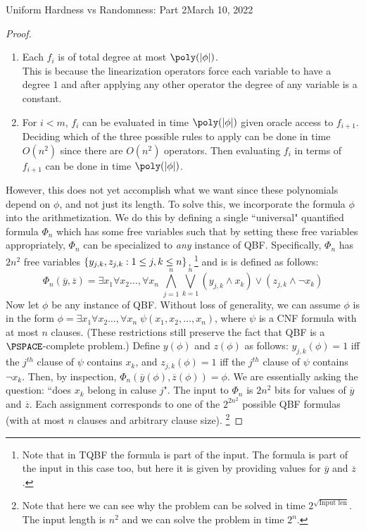 \begin{lecture}{8}{Uniform Hardness vs Randomness: Part 2}{March 10, 2022}
\begin{proof}
\begin{enumerate}
	\item Each $f_i$ is of total degree at most $\poly(\card{\phi})$. \\
	This is because the linearization operators force each variable to have a degree $1$ and after applying any other operator the degree of any variable is a constant.
	
	\item For $i < m$, $f_i$ can be evaluated in time $\poly(\card{\phi})$ given oracle access to $f_{i+1}$. \\
	Deciding which of the three possible rules to apply can be done in time $O(n^2)$ since there are $O(n^2)$ operators. Then evaluating $f_i$ in terms of $f_{i+1}$ can be done in time $\poly(\card{\phi})$.
\end{enumerate}

However, this does not yet accomplish what we want since these polynomials depend on $\phi$, and not just its length. To solve this, we incorporate the formula $\phi$ into the arithmetization. We do this by defining a single ``universal" quantified formula $\Phi_n$ which has some free variables such that by setting these free variables appropriately, $\Phi_n$ can be specialized to \emph{any} instance of QBF. Specifically, $\Phi_n$ has $2n^2$ free variables $\{y_{j,k}, z_{j,k} : 1 \leq j, k \leq n\}$, \footnote{Note that in TQBF the formula is part of the input. The formula is part of the input in this case too, but here it is given by providing values for $\overline{y}$ and $\overline{z}$. }
and is is defined as follows:
\[
	\Phi_n(\overline{y}, \overline{z}) = \exists x_1 \forall x_2 \ldots , \forall x_n \; \bigwedge_{j=1}^n \bigvee_{k=1}^n (y_{j,k} \wedge x_k) \vee (z_{j,k} \wedge \neg x_k)
\]
Now let $\phi$ be any instance of QBF. Without loss of generality, we can assume $\phi$ is in the form $\phi = \exists x_1 \forall x_2 \ldots , \forall x_n \; \psi(x_1,x_2, \ldots, x_n)$, where $\psi$ is a CNF formula with at most $n$ clauses. (These restrictions still preserve the fact that QBF is a $\PSPACE$-complete problem.)
Define $y(\phi)$ and $z(\phi)$ as follows: $y_{j,k}(\phi) = 1$ iff the $j^{th}$ clause of $\psi$ contains $x_k$, and $z_{j,k}(\phi) = 1$ iff the $j^{th}$ clause of $\psi$ contains $\neg x_k$. Then, by inspection, $\Phi_n(\overline{y}(\phi), \overline{z}(\phi)) = \phi$.
We are essentially asking the question: ``does $x_k$ belong in caluse $j$". The input to $\Phi_n$ is $2n^2$ bits for values of $\overline{y}$ and $\overline{z}$. Each assignment corresponds to one of the $2^{2n^2}$ possible QBF formulas (with at most $n$ clauses and arbitrary clause size). \footnote{Note that here we can see why the problem can be solved in time $2^{\sqrt{\text{Input len}}}$. The input length is $n^2$ and we can solve the problem in time $2^n$.}



\end{proof}
\end{lecture}
